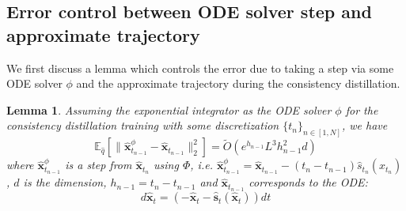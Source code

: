 \documentclass[11pt]{article}
\newcommand{\xh}[1]{\textcolor[HTML]{66CCFF}{#1}}
\def\rvx{{\mathbf{x}}}
\def\vs{{\bm{s}}}
\def\vy{{\bm{y}}}
\newtheorem{lemma}{Lemma}[section]
\begin{document}
\subsection{Error control between ODE solver step and approximate trajectory}
\label{error_control_ode_solver_approx_traj}
We first discuss a lemma which controls the error due to taking a step via some ODE solver $\phi$ and the approximate trajectory during the consistency distillation.

\vspace{0.1in}

\begin{lemma}
\label{lemma_for_gap_f_theta}
    Assuming the exponential integrator as the ODE solver $\phi$ for the consistency distillation training with some discretization $\{t_n\}_{n\in [1,N]}$, we have 
    \[
    \mathbb{E}_{\hat{q}}[\|\hat{\rvx}^\phi_{t_{n-1}}-\hat{\rvx}_{t_{n-1}}\|^2_2] = \tilde{O}(e^{h_{n-1}}L^3h_{n-1}^2d)
    \]
    where $\hat{\rvx}^\phi_{t_{n-1}}$ is a step from $\hat{\rvx}_{t_n}$ using $\Phi$, \textit{i.e.} $\hat{\rvx}^\phi_{t_{n-1}} = \hat{\rvx}_{t_{n-1}}-(t_n-t_{n-1})\hat{s}_{t_n}(x_{t_n})$, $d$ is the dimension, $h_{n-1}=t_n-t_{n-1}$ and $\hat{\rvx}_{t_{n-1}}$ corresponds to the ODE: 
    \vspace{0.1in}
    \[
    d \hat{\rvx}_t = \left(-\hat{\rvx}_t - \hat{\vs}_t(\hat{\rvx}_t)\right)dt
    \]
\end{lemma}
\end{document}
